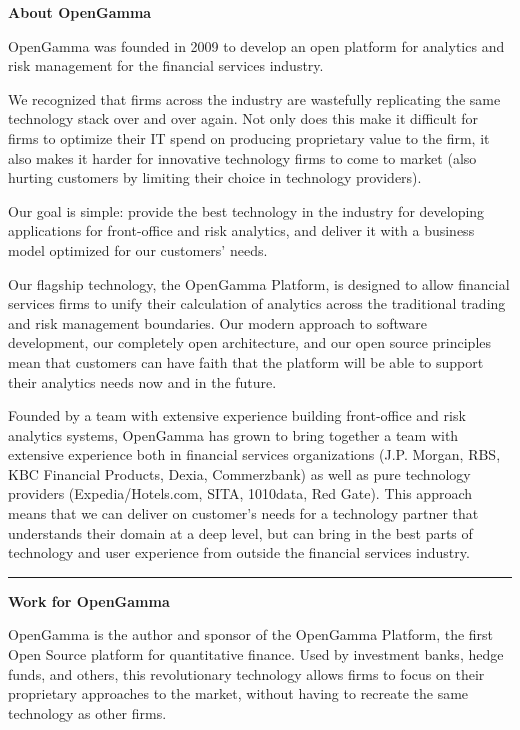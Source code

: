 \documentclass[custom, plainsections]{sciposter}
\begin{document}
\begin{multicols*}{3}
\small

\textbf{About OpenGamma}

OpenGamma was founded in 2009 to develop an open platform for analytics and risk management for the financial services industry.

We recognized that firms across the industry are wastefully replicating the same technology stack over and over again. Not only does this make it difficult for firms to optimize their IT spend on producing proprietary value to the firm, it also makes it harder for innovative technology firms to come to market (also hurting customers by limiting their choice in technology providers).

Our goal is simple: provide the best technology in the industry for developing applications for front-office and risk analytics, and deliver it with a business model optimized for our customers' needs.

Our flagship technology, the OpenGamma Platform, is designed to allow financial services firms to unify their calculation of analytics across the traditional trading and risk management boundaries. Our modern approach to software development, our completely open architecture, and our open source principles mean that customers can have faith that the platform will be able to support their analytics needs now and in the future.

Founded by a team with extensive experience building front-office and risk analytics systems, OpenGamma has grown to bring together a team with extensive experience both in financial services organizations (J.P. Morgan, RBS, KBC Financial Products, Dexia, Commerzbank) as well as pure technology providers (Expedia/Hotels.com, SITA, 1010data, Red Gate). This approach means that we can deliver on customer's needs for a technology partner that understands their domain at a deep level, but can bring in the best parts of technology and user experience from outside the financial services industry.

\vspace{0.5cm}
\hrule
\vspace{0.2cm}

\textbf{Work for OpenGamma}

OpenGamma is the author and sponsor of the OpenGamma Platform, the first Open Source platform for quantitative finance. Used by investment banks, hedge funds, and others, this revolutionary technology allows firms to focus on their proprietary approaches to the market, without having to recreate the same technology as other firms.


\end{multicols*}
\end{document}
